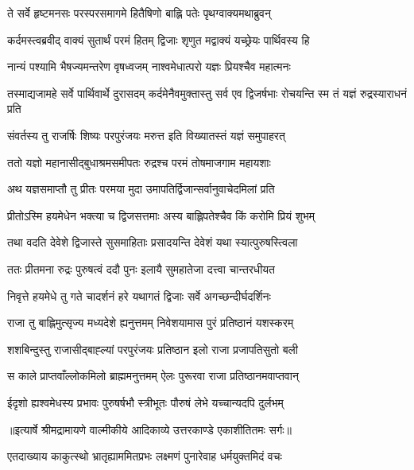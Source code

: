 \twolineshloka
{ते सर्वे हृष्टमनसः परस्परसमागमे}
{हितैषिणो बाह्लि पतेः पृथग्वाक्यमथाब्रुवन्} %

\twolineshloka
{कर्दमस्त्वब्रवीद् वाक्यं सुतार्थं परमं हितम्}
{द्विजाः शृणुत मद्वाक्यं यच्छ्रेयः पार्थिवस्य हि} %

\twolineshloka
{नान्यं पश्यामि भैषज्यमन्तरेण वृषध्वजम्}
{नाश्वमेधात्परो यज्ञः प्रियश्चैव महात्मनः} %

\threelineshloka
{तस्माद्यजामहे सर्वे पार्थिवार्थे दुरासदम्}
{कर्दमेनैवमुक्तास्तु सर्व एव द्विजर्षभाः}
{रोचयन्ति स्म तं यज्ञं रुद्रस्याराधनं प्रति} %

\twolineshloka
{संवर्तस्य तु राजर्षिः शिष्यः परपुरंजयः}
{मरुत्त इति विख्यातस्तं यज्ञं समुपाहरत्} %

\twolineshloka
{ततो यज्ञो महानासीद्बुधाश्रमसमीपतः}
{रुद्रश्च परमं तोषमाजगाम महायशाः} %

\twolineshloka
{अथ यज्ञसमाप्तौ तु प्रीतः परमया मुदा}
{उमापतिर्द्विजान्सर्वानुवाचेदमिलां प्रति} %

\twolineshloka
{प्रीतोऽस्मि हयमेधेन भक्त्या च द्विजसत्तमाः}
{अस्य बाह्लिपतेश्चैव किं करोमि प्रियं शुभम्} %

\twolineshloka
{तथा वदति देवेशे द्विजास्ते सुसमाहिताः}
{प्रसादयन्ति देवेशं यथा स्यात्पुरुषस्त्विला} %

\twolineshloka
{ततः प्रीतमना रुद्रः पुरुषत्वं ददौ पुनः}
{इलायै सुमहातेजा दत्त्वा चान्तरधीयत} %

\twolineshloka
{निवृत्ते हयमेधे तु गते चादर्शनं हरे}
{यथागतं द्विजाः सर्वे अगच्छन्दीर्घदर्शिनः} %

\twolineshloka
{राजा तु बाह्लिमुत्सृज्य मध्यदेशे ह्यनुत्तमम्}
{निवेशयामास पुरं प्रतिष्ठानं यशस्करम्} %

\twolineshloka
{शशबिन्दुस्तु राजासीद्बाह्ल्यां परपुरंजयः}
{प्रतिष्ठान इलो राजा प्रजापतिसुतो बली} %

\twolineshloka
{स काले प्राप्तवाँल्लोकमिलो ब्राह्ममनुत्तमम्}
{ऐलः पुरूरवा राजा प्रतिष्ठानमवाप्तवान्} %

\twolineshloka
{ईदृशो ह्यश्वमेधस्य प्रभावः पुरुषर्षभौ}
{स्त्रीभूतः पौरुषं लेभे यच्चान्यदपि दुर्लभम्} %


{॥इत्यार्षे श्रीमद्रामायणे वाल्मीकीये आदिकाव्ये उत्तरकाण्डे एकाशीतितमः सर्गः॥}


\twolineshloka
{एतदाख्याय काकुत्स्थो भ्रातृह्याममितप्रभः}
{लक्ष्मणं पुनारेवाह धर्मयुक्तमिदं वचः} %

